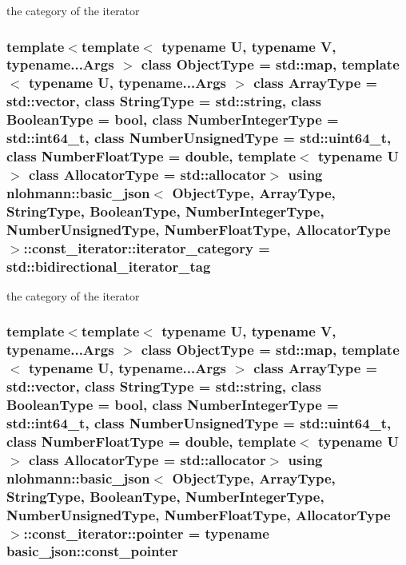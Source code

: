 the category of the iterator 

\hypertarget{classnlohmann_1_1basic__json_1_1const__iterator_a821560d64f50525162097f19b1392e7f}{
\subsubsection[{iterator\-\_\-category}]{\setlength{\rightskip}{0pt plus 5cm}template$<$template$<$ typename U, typename V, typename...\-Args $>$ class Object\-Type = std\-::map, template$<$ typename U, typename...\-Args $>$ class Array\-Type = std\-::vector, class String\-Type  = std\-::string, class Boolean\-Type  = bool, class Number\-Integer\-Type  = std\-::int64\-\_\-t, class Number\-Unsigned\-Type  = std\-::uint64\-\_\-t, class Number\-Float\-Type  = double, template$<$ typename U $>$ class Allocator\-Type = std\-::allocator$>$ using {\bf nlohmann\-::basic\-\_\-json}$<$ Object\-Type, Array\-Type, String\-Type, Boolean\-Type, Number\-Integer\-Type, Number\-Unsigned\-Type, Number\-Float\-Type, Allocator\-Type $>$\-::{\bf const\-\_\-iterator\-::iterator\-\_\-category} =  std\-::bidirectional\-\_\-iterator\-\_\-tag}}\label{classnlohmann_1_1basic__json_1_1const__iterator_a821560d64f50525162097f19b1392e7f}


the category of the iterator 

\hypertarget{classnlohmann_1_1basic__json_1_1const__iterator_a1da96fc3054d547e7706d3a2f073f389}{
\subsubsection[{pointer}]{\setlength{\rightskip}{0pt plus 5cm}template$<$template$<$ typename U, typename V, typename...\-Args $>$ class Object\-Type = std\-::map, template$<$ typename U, typename...\-Args $>$ class Array\-Type = std\-::vector, class String\-Type  = std\-::string, class Boolean\-Type  = bool, class Number\-Integer\-Type  = std\-::int64\-\_\-t, class Number\-Unsigned\-Type  = std\-::uint64\-\_\-t, class Number\-Float\-Type  = double, template$<$ typename U $>$ class Allocator\-Type = std\-::allocator$>$ using {\bf nlohmann\-::basic\-\_\-json}$<$ Object\-Type, Array\-Type, String\-Type, Boolean\-Type, Number\-Integer\-Type, Number\-Unsigned\-Type, Number\-Float\-Type, Allocator\-Type $>$\-::{\bf const\-\_\-iterator\-::pointer} =  typename {\bf basic\-\_\-json\-::const\-\_\-pointer}}}\label{classnlohmann_1_1basic__json_1_1const__iterator_a1da96fc3054d547e7706d3a2f073f389}



